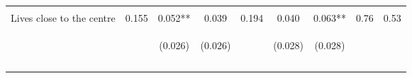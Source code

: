 \begin{tabular}{lcccccccc}
 & \begin{footnotesize}\end{footnotesize} & \begin{footnotesize}[0.017]\end{footnotesize} & \begin{footnotesize}[0.016]\end{footnotesize} & \begin{footnotesize}\end{footnotesize} & \begin{footnotesize}[0.505]\end{footnotesize} & \begin{footnotesize}[0.927]\end{footnotesize} & \begin{footnotesize}\end{footnotesize} & \begin{footnotesize}\end{footnotesize}\\
\noalign{\smallskip}Lives close to the centre & 0.155 & 0.052** & 0.039 & 0.194 & 0.040 & 0.063** & 0.76 & 0.53\\
 & \begin{footnotesize}\end{footnotesize} & \begin{footnotesize}(0.026)\end{footnotesize} & \begin{footnotesize}(0.026)\end{footnotesize} & \begin{footnotesize}\end{footnotesize} & \begin{footnotesize}(0.028)\end{footnotesize} & \begin{footnotesize}(0.028)\end{footnotesize} & \begin{footnotesize}\end{footnotesize} & \begin{footnotesize}\end{footnotesize}\\
 & \begin{footnotesize}\end{footnotesize} & \begin{footnotesize}[0.027]\end{footnotesize} & \begin{footnotesize}[0.034]\end{footnotesize} & \begin{footnotesize}\end{footnotesize} & \begin{footnotesize}[0.505]\end{footnotesize} & \begin{footnotesize}[0.136]\end{footnotesize} & \begin{footnotesize}\end{footnotesize} & \begin{footnotesize}\end{footnotesize}\\
\noalign{\smallskip}\hline\end{tabular}\\
